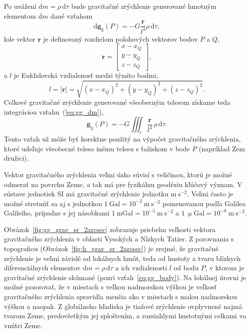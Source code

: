\documentclass[a4paper, 12pt]{book}
\newcommand{\diff}{\mathrm d}
\newcommand{\gidx}{\mathrm g}
\let\vec\mathbf
\begin{document}
Po uvážení $\diff m = \rho \, \diff \tau$ bude gravitačné zrýchlenie generované 
hmotným elementom $\diff m$ dané vzťahom
%
\begin{equation}
\label{eq:gg_dm}
\diff \vec g_\gidx(P) = -G \frac{\vec r}{l^3} \rho \, \diff\tau{,}
\end{equation}
%
kde vektor $\vec r$ je definovaný rozdielom polohových vektorov bodov $P$ 
a $Q$,
%
\begin{equation}
\label{eq:r}
\vec r = 
%
\begin{bmatrix}
x - x_Q \\
y - y_Q \\
z - z_Q
\end{bmatrix}
{,}
\end{equation}
%
a $l$ je Euklidovská vzdialenosť medzi týmito bodmi,
%
\begin{equation}
\label{eq:l}
l = | \vec r | = \sqrt{(x - x_Q)^2 + (y - y_Q)^2 + (z - z_Q)^2}{.}
\end{equation}
%
Celkové gravitačné zrýchlenie generované všeobecným telesom získame teda 
integráciou vzťahu~(\ref{eq:gg_dm}),
%
\begin{equation}
\label{eq:gg_body}
\vec g_\gidx(P) = -G \iiint_{\tau} \frac{\vec r}{l^3} \, \rho \, \diff\tau{.}
\end{equation}
%
Tento vzťah už môže byť korektne použitý na výpočet gravitačného zrýchlenia, 
ktoré udeľuje všeobecné teleso inému telesu s ťažiskom v bode $P$ (napríklad 
Zem družici).

Vektor gravitačného zrýchlenia veľmi úzko súvisí s veličinou, ktorú je možné 
odmerať na povrchu Zeme, a tak má pre fyzikálnu geodéziu kľúčový význam.  
V sústave jednotiek SI má gravitačné zrýchlenie jednotku $\mathrm{m}\ 
\mathrm{s}^{-2}$.  Veľmi často je možné stretnúť sa aj s jednotkou $1\ 
\mathrm{Gal} = 10^{-2}\ \mathrm{m}\ \mathrm{s}^{-2}$ pomenovanou podľa Galilea 
Galileiho, prípadne s jej násobkami $1\ \mathrm{mGal} = 10^{-5}\ \mathrm{m}\ 
\mathrm{s}^{-2}$ a $1\ \upmu \mathrm{Gal} = 10^{-8}\ \mathrm{m}\ 
\mathrm{s}^{-2}$.

Obrázok~\ref{fig:gg_grav_sr_2arcsec} zobrazuje priebehu veľkosti vektora 
gravitačného zrýchlenia v oblasti Vysokých a Nízkych Tatier.  Z porovnania 
s topografiou (Obrázok~\ref{fig:h_grav_sr_2arcsec}) je zrejmé, že gravitačné 
zrýchlenie je veľmi závislé od lokálnych hmôt, teda od hustoty a tvaru blízkych 
diferenciálnych elementov $\diff m = \rho \, \diff \tau$ a ich vzdialenosti $l$ 
od bodu $P$, v ktorom je gravitačné zrýchlenie skúmané (pozri 
vzťah~\ref{eq:gg_body}).  Na lokálnej úrovni je možné pozorovať, že v miestach 
s veľkou nadmorskou výškou je veľkosť gravitačného zrýchlenia spravidla menšia 
ako v miestach s malou nadmorskou výškou a naopak.  Z globálneho hľadiska je 
tiažové zrýchlenie ovplyvnené najmä tvarom Zeme, predovšetkým jej sploštením, 
a rozsiahlymi hustotnými celkami vo vnútri Zeme.
\end{document}
